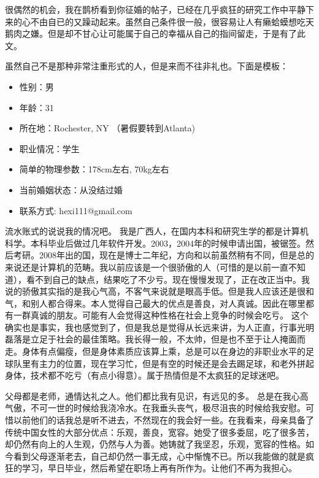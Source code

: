 \documentclass[10pt,letterpaper]{article}
\begin{document}

\begin{CJK}{UTF8}{gbsn}
很偶然的机会，我在鹊桥看到你征婚的帖子，已经在几乎疯狂的研究工作中平静下来的心不由自已的又躁动起来。虽然自己条件很一般，很容易让人有癞蛤蟆想吃天鹅肉之嫌。但是却不甘心让可能属于自己的幸福从自己的指间留走，于是有了此文。

虽然自己不是那种非常注重形式的人，但是来而不往非礼也。下面是模板：

\begin{itemize}
\item  性别：男
\item  年龄：31
\item  所在地：Rochester, NY （暑假要转到Atlanta)
\item  职业情况：学生
\item  简单的物理参数：178cm左右, 70kg左右
\item  当前婚姻状态：从没结过婚
\item  联系方式: hexi111@gmail.com
\end{itemize}

流水账式的说说我的情况吧。 我是广西人，在国内本科和研究生学的都是计算机科学。本科毕业后做过几年软件开发。2003，2004年的时候申请出国，被锯签。然后考研。2008年出的国，现在是博士二年纪，方向和以前虽然稍有不同，但是总的来说还是计算机的范畴。我以前应该是一个很骄傲的人（可惜的是以前一直不知道），看不到自己的缺点，结果吃了不少亏。现在慢慢发现了，正在改正当中。我说的骄傲其实指的是我心气高，不客气来说就是眼高手低。但是我人应该还是很和气，和别人都合得来。本人觉得自己最大的优点是善良，对人真诚。因此在哪里都有一群真诚的朋友。可能有人会觉得这种性格在社会上竞争的时候会吃亏。 这个确实也是事实，我也感觉到了，但是我总是觉得从长远来讲，为人正直，行事光明磊落是立足于社会的最佳策略。我长得一般，不太帅，但是也不至于让人掩面而走。身体有点偏瘦，但是身体素质应该算上乘，总是可以在身边的非职业水平的足球队里有主力的位置，现在学习忙，但是有空的时候还是会去踢足球，和老外拼起身体，技术都不吃亏（有点小得意）。属于热情但是不太疯狂的足球迷吧。


父母都是老师，通情达礼之人。他们都比我有见识，有远见的多。 总是在我心高气傲，不可一世的时候给我浇冷水。在我垂头丧气，极尽沮丧的时候给我安慰。可惜以前他们的话我总是听不进去，不然现在的我会好一些。在我看来，母亲具备了传统中国女性的大部分优点：乐观，善良，宽容。她受了很多委屈，吃了很多苦，却仍然有向上的人生观，仍然与人为善。她铸就了我坚忍，乐观，宽容的性格。如今看到父母逐渐老去，自己却仍然一事无成，心中惭愧不已。所以我能做的就是疯狂的学习，早日毕业，然后希望在职场上再有所作为。让他们不再为我担心。


\end{CJK}
\end{document}
